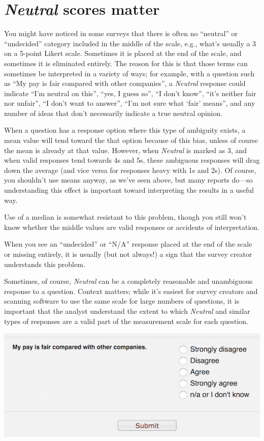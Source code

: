 \documentclass[]{book}
\begin{document}
\chapter{\texorpdfstring{\emph{Neutral} scores
matter}{Neutral scores matter}}\label{neutral-scores-matter}

You might have noticed in some surveys that there is often no
``neutral'' or ``undecided'' category included in the middle of the
scale, e.g., what's usually a 3 on a 5-point Likert scale. Sometimes it
is placed at the end of the scale, and sometimes it is eliminated
entirely. The reason for this is that those terms can sometimes be
interpreted in a variety of ways; for example, with a question such as
``My pay is fair compared with other companies'', a \emph{Neutral}
response could indicate ``I'm neutral on this'', ``yes, I guess so'',
``I don't know'', ``it's neither fair nor unfair'', ``I don't want to
answer'', ``I'm not sure what `fair' means'', and any number of ideas
that don't necessarily indicate a true neutral opinion.

When a question has a response option where this type of ambiguity
exists, a mean value will tend toward the that option because of this
bias, unless of course the mean is already at that value. However, when
\emph{Neutral} is marked as 3, and when valid responses tend towards 4s
and 5s, these ambiguous responses will drag down the average (and vice
versa for responses heavy with 1s and 2s). Of course, you shouldn't use
means anyway, as we've seen above, but many reports do---so
understanding this effect is important toward interpreting the results
in a useful way.

Use of a median is somewhat resistant to this problem, though you still
won't know whether the middle values are valid responses or accidents of
interpretation.

When you see an ``undecided'' or ``N/A'' response placed at the end of
the scale or missing entirely, it is usually (but not always!) a sign
that the survey creator understands this problem.

Sometimes, of course, \emph{Neutral} can be a completely reasonable and
unambiguous response to a question. Context matters; while it's easiest
for survey creators and scanning software to use the same scale for
large numbers of questions, it is important that the analyst understand
the extent to which \emph{Neutral} and similar types of responses are a
valid part of the measurement scale for each question.

\begin{center}\includegraphics[width=8in]{images/no_neutral} \end{center}
\end{document}
